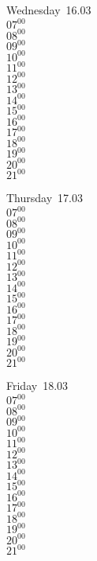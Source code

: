 \documentclass[11pt,a4paper]{book}\usepackage[]{graphicx}\usepackage[]{color}
\begin{document}
\begin{weekdaybox}
  Wednesday~16.03\\
  { 
  \vfill
  $07^{00}$\\
$08^{00}$\\
$09^{00}$\\
$10^{00}$\\
$11^{00}$\\
$12^{00}$\\
$13^{00}$\\
$14^{00}$\\
$15^{00}$\\
$16^{00}$\\
$17^{00}$\\
$18^{00}$\\
$19^{00}$\\
$20^{00}$\\
$21^{00}$\\
  }
\end{weekdaybox}
\clearpage
\begin{headerbox}
\end{headerbox}
\begin{weekdaybox}
  Thursday~17.03\\
  { 
  \vfill
  $07^{00}$\\
$08^{00}$\\
$09^{00}$\\
$10^{00}$\\
$11^{00}$\\
$12^{00}$\\
$13^{00}$\\
$14^{00}$\\
$15^{00}$\\
$16^{00}$\\
$17^{00}$\\
$18^{00}$\\
$19^{00}$\\
$20^{00}$\\
$21^{00}$\\
  }
\end{weekdaybox} 
\begin{weekdaybox}
  Friday~18.03\\
  { 
  \vfill
  $07^{00}$\\
$08^{00}$\\
$09^{00}$\\
$10^{00}$\\
$11^{00}$\\
$12^{00}$\\
$13^{00}$\\
$14^{00}$\\
$15^{00}$\\
$16^{00}$\\
$17^{00}$\\
$18^{00}$\\
$19^{00}$\\
$20^{00}$\\
$21^{00}$\\
  }
\end{weekdaybox}
\end{document}
